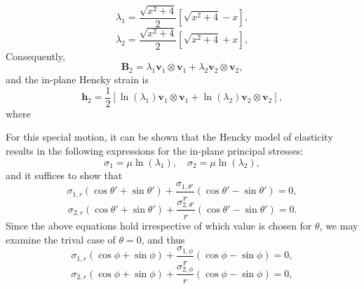 \documentclass[12pt]{article}
\begin{document}
\begin{equation}
	\lambda_1 = \frac{\sqrt{x^2 + 4}}{2} \left[ \sqrt{x^2 + 4} - x \right],
\end{equation}
\begin{equation}
	\lambda_2 = \frac{\sqrt{x^2 + 4}}{2} \left[ \sqrt{x^2 + 4} + x \right],
\end{equation}
Consequently,
\begin{equation}
	\mathbf{B}_2 = \lambda_1 \mathbf{v}_1 \otimes \mathbf{v}_1 + \lambda_2 \mathbf{v}_2 \otimes \mathbf{v}_2,
\end{equation}
and the in-plane Hencky strain is
\begin{equation}
	\mathbf{h}_2 = \frac{1}{2} \left[ \ln (\lambda_1) \mathbf{v}_1 \otimes \mathbf{v}_1 + \ln (\lambda_2) \mathbf{v}_2 \otimes \mathbf{v}_2 \right],
\end{equation}
where

For this special motion, it can be shown that the Hencky model of elasticity results in the following expressions for the in-plane principal stresses:
\begin{equation}
	\sigma_1 = \mu \ln (\lambda_1), \quad \sigma_2 = \mu \ln (\lambda_2),
\end{equation}
and it suffices to show that
\begin{equation}
	\sigma_{1,r} (\cos \theta' + \sin \theta') + \frac{\sigma_{1,\theta'}}{r} (\cos \theta' - \sin \theta') = 0,
\end{equation}
\begin{equation}
	\sigma_{2,r} (\cos \theta' + \sin \theta') + \frac{\sigma_{2,\theta'}}{r} (\cos \theta' - \sin \theta') = 0.
\end{equation}
Since the above equations hold irrespective of which value is chosen for $\theta$, we may examine the trival case of $\theta = 0$, and thus
\begin{equation}
	\sigma_{1,r} (\cos \phi + \sin \phi) + \frac{\sigma_{1,\phi}}{r} (\cos \phi - \sin \phi) = 0,
\end{equation}
\begin{equation}
	\sigma_{2,r} (\cos \phi + \sin \phi) + \frac{\sigma_{2,\phi}}{r} (\cos \phi - \sin \phi) = 0,
\end{equation}
\end{document}

